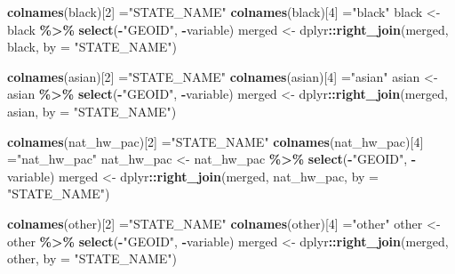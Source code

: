 \documentclass[
]{article}
\newenvironment{Shaded}{\begin{snugshade}}{\end{snugshade}}
\newcommand{\AttributeTok}[1]{\textcolor[rgb]{0.13,0.29,0.53}{#1}}
\newcommand{\DecValTok}[1]{\textcolor[rgb]{0.00,0.00,0.81}{#1}}
\newcommand{\FunctionTok}[1]{\textcolor[rgb]{0.13,0.29,0.53}{\textbf{#1}}}
\newcommand{\NormalTok}[1]{#1}
\newcommand{\OtherTok}[1]{\textcolor[rgb]{0.56,0.35,0.01}{#1}}
\newcommand{\SpecialCharTok}[1]{\textcolor[rgb]{0.81,0.36,0.00}{\textbf{#1}}}
\newcommand{\StringTok}[1]{\textcolor[rgb]{0.31,0.60,0.02}{#1}}
\begin{document}
\begin{Shaded}
\begin{Highlighting}[]
\FunctionTok{colnames}\NormalTok{(black)[}\DecValTok{2}\NormalTok{] }\OtherTok{=}\StringTok{"STATE\_NAME"}
\FunctionTok{colnames}\NormalTok{(black)[}\DecValTok{4}\NormalTok{] }\OtherTok{=}\StringTok{"black"}
\NormalTok{black }\OtherTok{\textless{}{-}}\NormalTok{ black }\SpecialCharTok{\%\textgreater{}\%} \FunctionTok{select}\NormalTok{(}\SpecialCharTok{{-}}\StringTok{"GEOID"}\NormalTok{, }\SpecialCharTok{{-}}\NormalTok{variable)}
\NormalTok{merged }\OtherTok{\textless{}{-}}\NormalTok{ dplyr}\SpecialCharTok{::}\FunctionTok{right\_join}\NormalTok{(merged, black, }\AttributeTok{by =} \StringTok{"STATE\_NAME"}\NormalTok{)}

\FunctionTok{colnames}\NormalTok{(asian)[}\DecValTok{2}\NormalTok{] }\OtherTok{=}\StringTok{"STATE\_NAME"}
\FunctionTok{colnames}\NormalTok{(asian)[}\DecValTok{4}\NormalTok{] }\OtherTok{=}\StringTok{"asian"}
\NormalTok{asian }\OtherTok{\textless{}{-}}\NormalTok{ asian }\SpecialCharTok{\%\textgreater{}\%} \FunctionTok{select}\NormalTok{(}\SpecialCharTok{{-}}\StringTok{"GEOID"}\NormalTok{, }\SpecialCharTok{{-}}\NormalTok{variable)}
\NormalTok{merged }\OtherTok{\textless{}{-}}\NormalTok{ dplyr}\SpecialCharTok{::}\FunctionTok{right\_join}\NormalTok{(merged, asian, }\AttributeTok{by =} \StringTok{"STATE\_NAME"}\NormalTok{)}

\FunctionTok{colnames}\NormalTok{(nat\_hw\_pac)[}\DecValTok{2}\NormalTok{] }\OtherTok{=}\StringTok{"STATE\_NAME"}
\FunctionTok{colnames}\NormalTok{(nat\_hw\_pac)[}\DecValTok{4}\NormalTok{] }\OtherTok{=}\StringTok{"nat\_hw\_pac"}
\NormalTok{nat\_hw\_pac }\OtherTok{\textless{}{-}}\NormalTok{ nat\_hw\_pac }\SpecialCharTok{\%\textgreater{}\%} \FunctionTok{select}\NormalTok{(}\SpecialCharTok{{-}}\StringTok{"GEOID"}\NormalTok{, }\SpecialCharTok{{-}}\NormalTok{variable)}
\NormalTok{merged }\OtherTok{\textless{}{-}}\NormalTok{ dplyr}\SpecialCharTok{::}\FunctionTok{right\_join}\NormalTok{(merged, nat\_hw\_pac, }\AttributeTok{by =} \StringTok{"STATE\_NAME"}\NormalTok{)}

\FunctionTok{colnames}\NormalTok{(other)[}\DecValTok{2}\NormalTok{] }\OtherTok{=}\StringTok{"STATE\_NAME"}
\FunctionTok{colnames}\NormalTok{(other)[}\DecValTok{4}\NormalTok{] }\OtherTok{=}\StringTok{"other"}
\NormalTok{other }\OtherTok{\textless{}{-}}\NormalTok{ other }\SpecialCharTok{\%\textgreater{}\%} \FunctionTok{select}\NormalTok{(}\SpecialCharTok{{-}}\StringTok{"GEOID"}\NormalTok{, }\SpecialCharTok{{-}}\NormalTok{variable)}
\NormalTok{merged }\OtherTok{\textless{}{-}}\NormalTok{ dplyr}\SpecialCharTok{::}\FunctionTok{right\_join}\NormalTok{(merged, other, }\AttributeTok{by =} \StringTok{"STATE\_NAME"}\NormalTok{)}


\end{Highlighting}
\end{Shaded}
\end{document}
